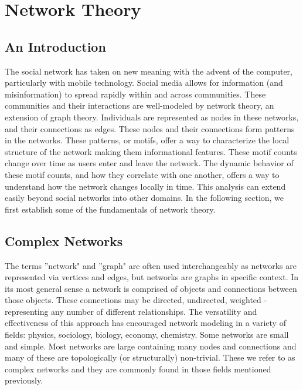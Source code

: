 %

\chapter{Network Theory}

\section{An Introduction}
The social network has taken on new meaning with the advent of the computer, particularly with 
mobile technology. Social media allows for information (and misinformation) to spread rapidly
within and across communities. These communities and their interactions are well-modeled by network theory, an extension of graph theory.
Individuals are represented as nodes in these networks, and their connections as edges. These nodes and their
connections form patterns in the networks. These patterns, or motifs, offer
a way to characterize the local structure of the network making them informational features. These motif counts change
over time as users enter and leave the network. The dynamic behavior of these motif counts, and how they correlate with 
one another, offers a way to understand how the network changes locally in time. This analysis can 
extend easily beyond social networks into other domains. In the following section, we first establish 
some of the fundamentals of network theory.


\section{Complex Networks}
The terms ''network" and ''graph" are often used interchangeably as networks are represented
via vertices and edges, but networks are graphs in specific context. In its 
most general sense a network is comprised of objects and connections between those objects. These
connections may be directed, undirected, weighted - representing any number of different relationships. 
The versatility and effectiveness of this approach has encouraged network modeling in a 
variety of fields: physics, sociology, biology, economy, chemistry.
Some networks are small and simple. Most networks are large containing many nodes and connections and many of these are
topologically (or structurally) non-trivial. These we refer to as complex networks and they are 
commonly found in those fields mentioned previously. 

